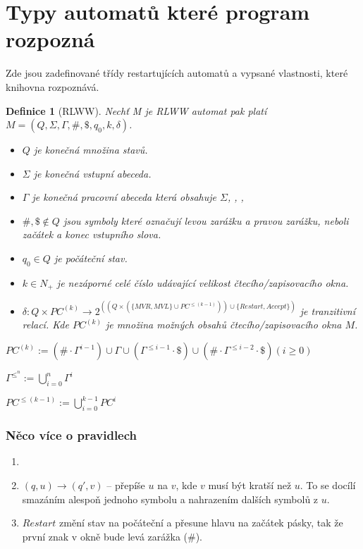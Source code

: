 \documentclass{article}
\newtheorem{definition}{Definice}
\begin{document}
\section{Typy automatů které program rozpozná}
Zde jsou zadefinované třídy restartujících automatů a vypsané vlastnosti, které knihovna rozpoznává.

\begin{definition}[RLWW]
Nechť M je RLWW automat pak platí $M = (Q ,\Sigma, \Gamma, \# , \$, q_0, k, \delta)$.
\begin{itemize}
	\item  $Q$ je konečná množina stavů.
	\item  $\Sigma$  je konečná vstupní abeceda.
	\item  $\Gamma$ je konečná pracovní abeceda která obsahuje $\Sigma$, ,  ,
	\item  $\#, \$ \notin Q$ jsou symboly které označují levou zarážku a pravou zarážku, neboli začátek a konec vstupního slova.
	\item  $q_0 \in Q$ je počáteční stav.
	\item  $k \in N_+$ je nezáporné celé číslo udávající velikost čtecího/zapisovacího okna.
	\item  $\delta : Q \times PC^{(k)} \to 2^{((Q\times(\{MVR,MVL\}\cup PC^{\leq (k-1)}))\cup \{Restart, Accept\})}$
		je tranzitivní relací. Kde $PC^{(k)}$ je množina možných obsahů čtecího/zapisovacího okna $M$.
\end{itemize}

$PC^{(k)} := (\# \cdot \Gamma ^{i-1}) \cup 
		\Gamma \cup 
		(\Gamma ^{\leq i-1} \cdot \$) \cup 
		(\# \cdot \Gamma ^{\leq i-2} \cdot \$) (i \geq 0)$

$\Gamma^{\leq ^n} := \bigcup\limits_{i=0}^{n} \Gamma^{i} $ 

$PC^{\leq(k-1)} := \bigcup\limits_{i=0}^{k-1} PC^{i}$

\end{definition}
\subsubsection{Něco více o pravidlech}
\begin{enumerate}
	\item
	\item $(q, u)\to(q', v)$ -- přepíše $u$ na $v$, kde $v$ musí být kratší než $u$.
	To se docílí smazáním alespoň jednoho symbolu a nahrazením dalších symbolů z $u$.
	\item  $Restart$ změní stav na počáteční a přesune hlavu na začátek pásky, tak že první znak v okně bude levá zarážka (\#).
\end{enumerate}
\end{document}
